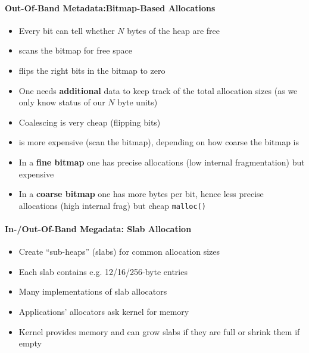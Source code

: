 \paragraph[Bitmap-Based Allocations]{Out-Of-Band Metadata:\newline Bitmap-Based Allocations}
\begin{itemize}
    \item Every bit can tell whether $N$ bytes of the heap are free
    \item {} scans the bitmap for free space %
    \item {} flips the right bits in the bitmap to zero %
    \item One needs \textbf{additional} data to keep track of the total allocation sizes (as we only know status of our $N$ byte units)
\end{itemize}


\begin{itemize}
    \item Coalescing is very cheap (flipping bits)
    \item {} is more expensive (scan the bitmap), depending on how coarse the bitmap is %
    \item In a \textbf{fine bitmap} one has precise allocations (low internal fragmentation) but expensive  %
    \item In a \textbf{coarse bitmap} one has more bytes per bit, hence less precise allocations (high internal frag) but cheap \lstinline{malloc()} %
\end{itemize}


\paragraph{In-/Out-Of-Band Megadata: Slab Allocation}

\begin{itemize}
    \item Create ``sub-heaps'' (slabs) for common allocation sizes
    \item Each slab contains e.g. 12/16/256-byte entries
    \item Many implementations of slab allocators
    \item Applications'  allocators ask kernel for memory
    \item Kernel provides memory and can grow slabs if they are full or shrink them if empty
\end{itemize}

